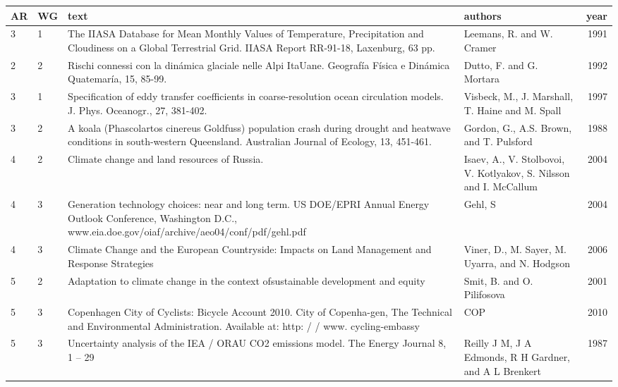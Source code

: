 \begin{tabular}{l l p{4.5cm} p{2.5cm} r}
\toprule
 AR &  WG &                                                                                                                                                                           text &                                                            authors &  year \\
\midrule
 3 &  1 &  The IIASA Database for Mean Monthly   Values of Temperature, Precipitation and Cloudiness on a Global Terrestrial   Grid. IIASA Report RR-91-18, Laxenburg, 63 pp. &  Leemans, R. and W. Cramer &  1991 \\
 2 &  2 &  Rischi connessi con la dinámica glaciale nelle Alpi ItaUane. Geografía Física e Dinámica Quatemaría, 15, 85-99.  &  Dutto, F. and G. Mortara &  1992 \\
 3 &  1 &  Specification   of eddy transfer coefficients in coarse-resolution ocean circulation models.   J. Phys. Oceanogr., 27, 381-402. &  Visbeck, M., J. Marshall, T. Haine and M. Spall &  1997 \\
 3 &  2 &  A koala (Phascolartos   cinereus Goldfuss) population crash during drought and heatwave conditions in   south-western Queensland. Australian Journal of Ecology, 13, 451-461. &  Gordon, G., A.S. Brown, and T. Pulsford &  1988 \\
 4 &  2 &  Climate change and land resources of Russia. &  Isaev, A., V. Stolbovoi, V. Kotlyakov, S. Nilsson and I. McCallum &  2004 \\
 4 &  3 &  Generation technology choices: near and long term. US DOE/EPRI Annual Energy Outlook Conference, Washington D.C., www.eia.doe.gov/oiaf/archive/aeo04/conf/pdf/gehl.pdf  &  Gehl, S &  2004 \\
 4 &  3 &  Climate Change and the European Countryside: Impacts on Land Management and Response Strategies &  Viner, D., M. Sayer, M. Uyarra, and N. Hodgson &  2006 \\
 5 &  2 &  Adaptation to climate change in the context ofsustainable development and equity &  Smit, B. and O. Pilifosova &  2001 \\
 5 &  3 &  Copenhagen City of Cyclists: Bicycle Account 2010. City of Copenha-gen, The Technical and Environmental Administration. Available at: http: / / www. cycling-embassy &  COP &  2010 \\
 5 &  3 &  Uncertainty analysis of the IEA / ORAU CO2 emissions model. The Energy Journal 8, 1 – 29 &  Reilly J M, J A Edmonds, R H Gardner, and A L Brenkert &  1987 \\
\bottomrule
\end{tabular}
